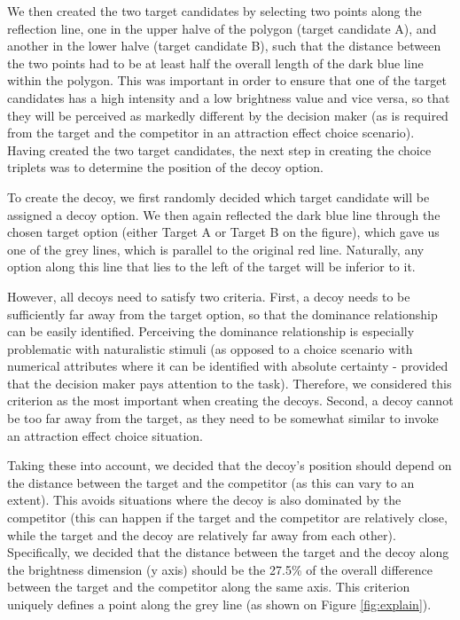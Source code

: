 \documentclass[11pt,a4paper]{article}
\begin{document}
 We then created the two target candidates by selecting two points along the reflection line, one in the upper halve of the polygon (target candidate A), and another in the lower halve (target candidate B), such that the distance between the two points had to be at least half the overall length of the dark blue line within the polygon. This was important in order to ensure that one of the target candidates has a high intensity and a low brightness value and vice versa, so that they will be perceived as markedly different by the decision maker (as is required from the target and the competitor in an attraction effect choice scenario). Having created the two target candidates, the next step in creating the choice triplets was to determine the position of the decoy option. 

To create the decoy, we first randomly decided which target candidate will be assigned a decoy option. We then again reflected the dark blue line through the chosen target option (either Target A or Target B on the figure), which gave us one of the grey lines, which is parallel to the original red line. Naturally, any option along this line that lies to the left of the target will be inferior to it. 

However, all decoys need to satisfy two criteria. First, a decoy needs to be sufficiently far away from the target option, so that the dominance relationship can be easily identified. Perceiving the dominance relationship is especially problematic with naturalistic stimuli (as opposed to a choice scenario with numerical attributes where it can be identified with absolute certainty - provided that the decision maker pays attention to the task). Therefore, we considered this criterion as the most important when creating the decoys. Second, a decoy cannot be too far away from the target, as they need to be somewhat similar to invoke an attraction effect choice situation.

Taking these into account, we decided that the decoy's position should depend on the distance between the target and the competitor (as this can vary to an extent). This avoids situations where the decoy is also dominated by the competitor (this can happen if the target and the competitor are relatively close, while the target and the decoy are relatively far away from each other). Specifically, we decided that the distance between the target and the decoy along the brightness dimension (y axis) should be the 27.5\% of the overall difference between the target and the competitor along the same axis. This criterion uniquely defines a point along the grey line (as shown on Figure \ref{fig:explain}).
\end{document}
